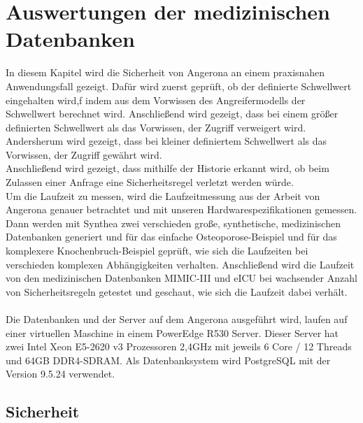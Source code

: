 \documentclass[german,version-2020-11]{uzl-thesis}
\begin{document}
\chapter{Auswertungen der medizinischen Datenbanken }\label{chap:Auswertung}
In diesem Kapitel wird die Sicherheit von Angerona an einem praxisnahen Anwendungsfall gezeigt. Dafür wird zuerst geprüft, ob der definierte Schwellwert eingehalten wird,f indem aus dem Vorwissen des Angreifermodells der Schwellwert berechnet wird. Anschließend wird gezeigt, dass bei einem größer definierten Schwellwert als das Vorwissen, der Zugriff verweigert wird. Andersherum wird gezeigt, dass bei kleiner definiertem Schwellwert als das Vorwissen, der Zugriff gewährt wird.\\  Anschließend wird gezeigt, dass mithilfe der Historie erkannt wird, ob beim Zulassen einer Anfrage eine Sicherheitsregel verletzt werden würde. \\ Um die Laufzeit zu messen, wird die Laufzeitmessung aus der Arbeit von Angerona genauer betrachtet und mit unseren Hardwarespezifikationen gemessen. Dann werden mit Synthea zwei verschieden große, synthetische, medizinischen Datenbanken generiert und  für das einfache Osteoporose-Beispiel und für das komplexere Knochenbruch-Beispiel geprüft, wie sich die Laufzeiten bei verschieden komplexen Abhängigkeiten verhalten. Anschließend wird die Laufzeit von den medizinischen Datenbanken MIMIC-III und eICU bei wachsender Anzahl von Sicherheitsregeln getestet und geschaut, wie sich die Laufzeit dabei verhält. \\ \\
Die Datenbanken und der Server auf dem Angerona ausgeführt wird, laufen auf einer virtuellen Maschine in einem PowerEdge R530 Server. Dieser Server hat zwei Intel Xeon E5-2620 v3 Prozessoren 2,4GHz mit jeweils 6 Core / 12 Threads und 64GB DDR4-SDRAM. Als Datenbanksystem wird PostgreSQL mit der Version 9.5.24 verwendet. \\ 

\section{Sicherheit}
\end{document}

